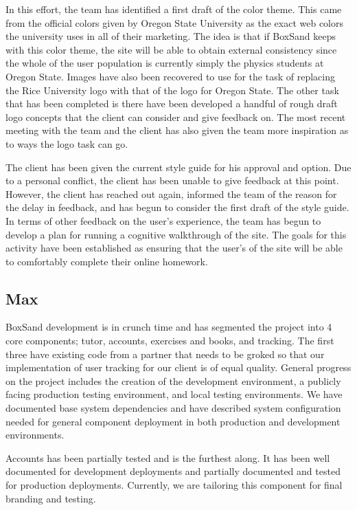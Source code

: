 \documentclass[onecolumn, draftclsnofoot,10pt, compsoc]{IEEEtran}
\begin{document}
In this effort, the team has identified a first draft of the color theme. This came from the official colors given by Oregon State University as the exact web colors the university uses in all of their marketing. The idea is that if BoxSand keeps with this color theme, the site will be able to obtain external consistency since the whole of the user population is currently simply the physics students at Oregon State. Images have also been recovered to use for the task of replacing the Rice University logo with that of the logo for Oregon State. The other task that has been completed is there have been developed a handful of rough draft logo concepts that the client can consider and give feedback on. The most recent meeting with the team and the client has also given the team more inspiration as to ways the logo task can go.

The client has been given the current style guide for his approval and option. Due to a personal conflict, the client has been unable to give feedback at this point. However, the client has reached out again, informed the team of the reason for the delay in feedback, and has begun to consider the first draft of the style guide. In terms of other feedback on the user’s experience, the team has begun to develop a plan for running a cognitive walkthrough of the site. The goals for this activity have been established as ensuring that the user’s of the site will be able to comfortably complete their online homework. 

\subsection{Max}
BoxSand development is in crunch time and has segmented the project into 4 core components; tutor, accounts, exercises and books, and tracking. The first three have existing code from a partner that needs to be groked so that our implementation of user tracking for our client is of equal quality. General progress on the project includes the creation of the development environment, a publicly facing production testing environment, and local testing environments. We have documented base system dependencies and have described system configuration needed for general component deployment in both production and development environments. 

Accounts has been partially tested and is the furthest along. It has been well documented for development deployments and partially documented and tested for production deployments. Currently, we are tailoring this component for final branding and testing.  
\end{document}
